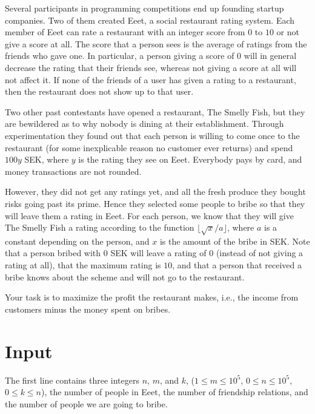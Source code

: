 
%

Several participants in programming competitions end up founding
startup companies. Two of them created Eeet, a social restaurant
rating system. Each member of Eeet can rate a restaurant with an
integer score from $0$ to $10$ or not give a score at all. The score
that a person sees is the average of ratings from the friends who gave
one. In particular, a person giving a score of $0$ will in general
decrease the rating that their friends see, whereas not giving a score
at all will not affect it. If none of the friends of a user has given
a rating to a restaurant, then the restaurant does not show up to that
user.

Two other past contestants have opened a restaurant, The Smelly Fish,
but they are bewildered as to why nobody is dining at their
establishment. Through experimentation they found out that each person
is willing to come once to the restaurant (for some inexplicable
reason no customer ever returns) and spend $100y$ SEK, where $y$ is
the rating they see on Eeet. Everybody pays by card, and money
transactions are not rounded.

However, they did not get any ratings yet, and all the fresh produce
they bought risks going past its prime. Hence they selected some
people to bribe so that they will leave them a rating in Eeet. For
each person, we know that they will give The Smelly Fish a rating
according to the function $\lfloor\sqrt{x}/a\rfloor$, where $a$ is a
constant depending on the person, and $x$ is the amount of the bribe
in SEK. Note that a person bribed with $0$ SEK will leave a rating of
$0$ (instead of not giving a rating at all), that the maximum rating
is $10$, and that a person that received a bribe knows about the
scheme and will not go to the restaurant.

Your task is to maximize the profit the restaurant makes, i.e., the
income from customers minus the money spent on bribes.

\section*{Input}

The first line contains three integers $n$, $m$, and $k$,
($1 \leq m \leq 10^5$, $0 \leq n \leq 10^5$, $0 \leq k \leq n$), the
number of people in Eeet, the number of friendship relations, and the
number of people we are going to bribe.


